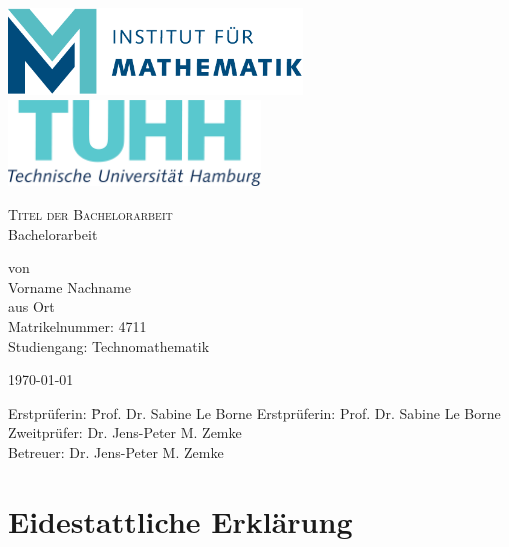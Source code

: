 \documentclass[12pt]{article}
\theoremstyle{definition}
\numberwithin{equation}{section}
\begin{document}
\thispagestyle{empty}

\begin{center}
  \includegraphics[height=2.3cm]{pics/MATH_de}
  \hfill
  \includegraphics[height=2.3cm]{pics/TUHH_de}
\end{center}

\vspace*{5em}

\begin{center}
  {\Huge
    \textsc{Titel der Bachelorarbeit}\\[2em]
  }
  {\LARGE
    Bachelorarbeit
  }

  \vspace*{2em}

  {\Large
    von\\
    Vorname Nachname\\
    aus Ort\\
    Matrikelnummer: 4711\\
    Studiengang: Technomathematik\\
  }
\end{center}

\vfill
\begin{center}
  \today
\end{center}
\vfill

\begin{tabbing}
  Erstprüferin: \= Prof. Dr. Sabine Le Borne\kill
  Erstprüferin: \> Prof. Dr. Sabine Le Borne\\
  Zweitprüfer:  \> Dr. Jens-Peter M. Zemke\\
  Betreuer:     \> Dr. Jens-Peter M. Zemke\\
\end{tabbing}
\newpage
\thispagestyle{empty}
\mbox{}
\newpage

\section*{Eidestattliche Erklärung}
\end{document}
